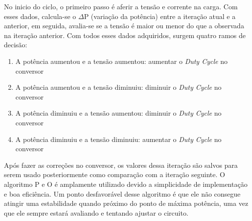 \noindent
\begin{minipage}{\linewidth}
\label{PO_flux_fig}
\end{minipage}

No inicio do ciclo, o primeiro passo é aferir a tensão e corrente na carga. Com esses dados, calcula-se o $\Delta$P (variação da potência) entre a iteração atual e a anterior, em seguida, avalia-se se a tensão é maior ou menor do que a observada na iteração anterior. Com todos esses dados adquiridos, surgem quatro ramos de decisão:
\begin{enumerate}
    \item A potência aumentou e a tensão aumentou: aumentar o \textit{Duty Cycle} no conversor 
    \item A potência aumentou e a tensão diminuiu: diminuir o \textit{Duty Cycle} no conversor
    \item A potência diminuiu e a tensão aumentou: diminuir o \textit{Duty Cycle} no conversor
    \item A potência diminuiu e a tensão diminuiu: aumentar o \textit{Duty Cycle} no conversor
\end{enumerate}

Após fazer as correções no conversor, os valores dessa iteração são salvos para serem usado posteriormente como comparação com a iteração seguinte. O algoritmo P e O é amplamente utilizado devido a simplicidade de implementação e boa eficiência. Um ponto desfavorável desse algoritmo é que ele não consegue atingir uma estabilidade quando próximo do ponto de máxima potência, uma vez que ele sempre estará avaliando e tentando ajustar o circuito.

